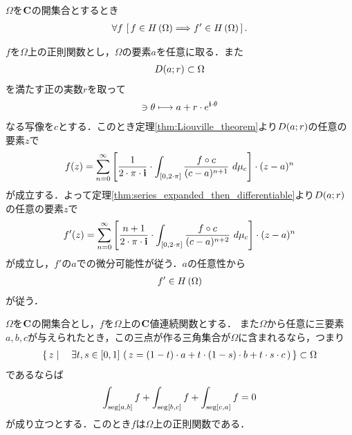 	\begin{screen}
		\begin{thm}[正則関数の導関数も正則]\label{thm:derivative_of_holomorphic_function_is_holomorphic}
			$\Omega$を$\mathbf{C}$の開集合とするとき
			\begin{align}
				\forall f\, \left[\, f \in H\left(\Omega\right) \Longrightarrow f' \in H\left(\Omega\right)\, \right].
			\end{align}
		\end{thm}
	\end{screen}
	
	\begin{sketch}
		$f$を$\Omega$上の正則関数とし，$\Omega$の要素$a$を任意に取る．また
		\begin{align}
			D(a;r) \subset \Omega
		\end{align}
		を満たす正の実数$r$を取って
		\begin{align}
			[0,2\cdot\pi] \ni \theta \longmapsto a + r \cdot e^{\isym \cdot \theta}
		\end{align}
		なる写像を$c$とする．このとき定理\ref{thm:Liouville_theorem}より$D(a;r)$の任意の要素$z$で
		\begin{align}
			f(z) = \sum_{n=0}^{\infty} \left[ \frac{1}{2\cdot\pi\cdot\mathbf{i}} \cdot \int_{[0,2\cdot\pi]} \frac{f \circ c}{(c - a)^{n+1}}\ d\mu_{c} \right] \cdot (z-a)^{n}
		\end{align}
		が成立する．よって定理\ref{thm:series_expanded_then_differentiable}より$D(a;r)$の任意の要素$z$で
		\begin{align}
			f'(z) = \sum_{n=0}^{\infty} \left[ \frac{n+1}{2\cdot\pi\cdot\mathbf{i}} \cdot \int_{[0,2\cdot\pi]} \frac{f \circ c}{(c - a)^{n+2}}\ d\mu_{c} \right] \cdot (z-a)^{n}
		\end{align}
		が成立し，$f'$の$a$での微分可能性が従う．$a$の任意性から
		\begin{align}
			f' \in H\left(\Omega\right)
		\end{align}
		が従う．
		\QED
	\end{sketch}
	
	\begin{screen}
		\begin{thm}[Moreraの定理]
			$\Omega$を$\mathbf{C}$の開集合とし，$f$を$\Omega$上の$\mathbf{C}$値連続関数とする．
			また$\Omega$から任意に三要素$a,b,c$が与えられたとき，この三点が作る三角集合が$\Omega$に含まれるなら，つまり
			\begin{align}
				\left\{\, z \mid \quad \exists t,s \in [0,1]\, 
				\left(\, z = (1-t) \cdot a 
				+ t \cdot (1-s) \cdot b 
				+ t \cdot s \cdot c\, \right)\, \right\}
				\subset \Omega
			\end{align}
			であるならば
			\begin{align}
				\int_{\operatorname{seg}[a,b]} f + \int_{\operatorname{seg}[b,c]} f + \int_{\operatorname{seg}[c,a]} f = 0
			\end{align}
			が成り立つとする．このとき$f$は$\Omega$上の正則関数である．
		\end{thm}
	\end{screen}
	
